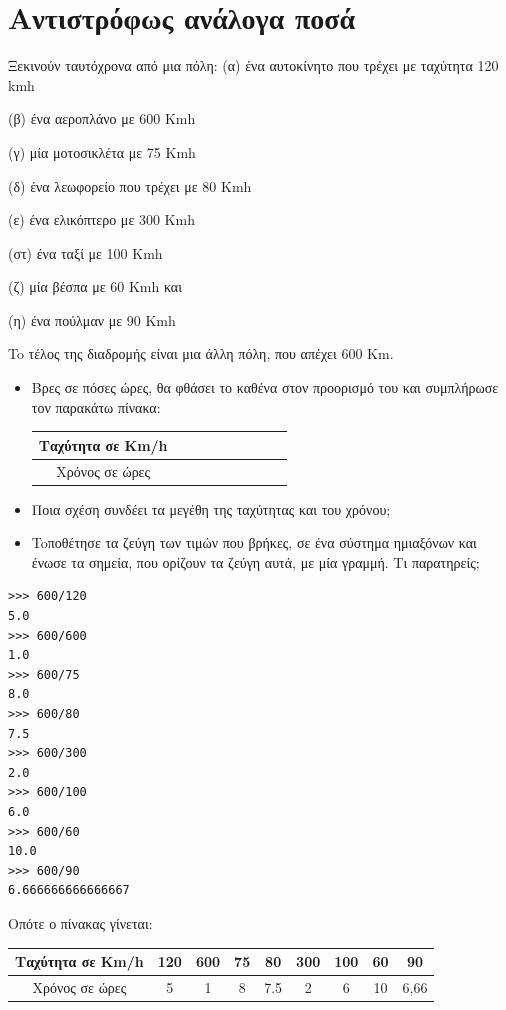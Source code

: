 \section{Αντιστρόφως ανάλογα ποσά}
\begin{exercise}
Ξεκινούν ταυτόχρονα από μια πόλη:  
(α)  ένα αυτοκίνητο που τρέχει με ταχύτητα 120 kmh  

(β)  ένα αεροπλάνο με 600 Kmh  

(γ)  μία μοτοσικλέτα με 75 Kmh  

(δ)  ένα λεωφορείο που τρέχει με 80 Kmh  

(ε)  ένα ελικόπτερο με 300 Kmh 

(στ)  ένα ταξί με 100 Kmh  

(ζ)  μία βέσπα με 60 Kmh και  

(η)  ένα πούλμαν με 90 Kmh

To τέλος της διαδρομής είναι μια άλλη πόλη, που απέχει 600 Km.
\begin{itemize}
 \item Βρες σε πόσες ώρες, θα φθάσει το καθένα στον προορισμό του και συμπλήρωσε  τον παρακάτω πίνακα:
 \begin{table}
 \begin{tabular}{|c|c|c|c|c|c|c|c|c|}
 Ταχύτητα σε Km/h&&&&&&&&\\\hline
 Χρόνος σε ώρες&&&&&&&&\\\hline
 \end{tabular}
 \end{table}
 \item Ποια σχέση συνδέει τα μεγέθη της ταχύτητας και του χρόνου;
 \item Toποθέτησε τα ζεύγη των τιμών που βρήκες, σε ένα σύστημα ημιαξόνων και  ένωσε τα σημεία, που ορίζουν τα ζεύγη αυτά, με μία γραμμή. Τι παρατηρείς;
\end{itemize}
\end{exercise}
\begin{lstlisting}
>>> 600/120
5.0
>>> 600/600
1.0
>>> 600/75
8.0
>>> 600/80
7.5
>>> 600/300
2.0
>>> 600/100
6.0
>>> 600/60
10.0
>>> 600/90
6.666666666666667
\end{lstlisting}
Οπότε ο πίνακας γίνεται:
\begin{table}
 \begin{tabular}{|c|c|c|c|c|c|c|c|c|}
 Ταχύτητα σε Km/h&120&600&75&80&300&100&60&90\\\hline
 Χρόνος σε ώρες&5&1&8&7.5&2&6&10&6,66\\\hline
 \end{tabular}
 \end{table}

